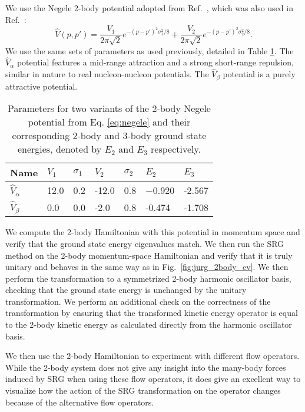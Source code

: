We use the Negele 2-body potential adopted from Ref.~\cite{Alexandrou:1988jg}, which was also used in Ref.~\cite{Jurgenson:2008jp}:
\begin{equation}\label{eq:negele}
\hat{V}(p, p') = \frac{V_1}{2\pi\sqrt2}e^{-(p-p')^2\sigma_1^2/8} + \frac{V_2}{2\pi\sqrt2}e^{-(p-p')^2\sigma_2^2/8}.
\end{equation}
We use the same sets of parameters as used previously, detailed in Table \ref{table:negele_params}. The $\hat{V}_\alpha$ potential features a mid-range attraction and a strong short-range repulsion, similar in nature to real nucleon-nucleon potentials. The $\hat{V}_\beta$ potential is a purely attractive potential.

\begin{table}[t]
\begin{center}
\begin{tabularx}{\textwidth}{ X X X X X X X } 
 \hline
 Name & $V_1$ & $\sigma_1$ & $V_2$ & $\sigma_2$ & $E_2$ & $E_3$ \\ 
 \hline
 $\hat{V}_\alpha$ & 12.0 & 0.2 & -12.0 & 0.8 & −0.920 & -2.567\\ 
 $\hat{V}_\beta$ & 0.0 & 0.0 & -2.0 & 0.8 & -0.474 & -1.708 \\ 
 \hline
\end{tabularx}
\end{center}
\caption{Parameters for two variants of the 2-body Negele potential from Eq. \ref{eq:negele} and their corresponding 2-body and 3-body ground state energies, denoted by $E_2$ and $E_3$ respectively.}
\label{table:negele_params}
\end{table}

We compute the 2-body Hamiltonian with this potential in momentum space and verify that the ground state energy eigenvalues match. We then run the SRG method on the 2-body momentum-space Hamiltonian and verify that it is truly unitary and behaves in the same way as in Fig.~\ref{fig:jurg_2body_ev}. We then perform the transformation to a symmetrized 2-body harmonic oscillator basis, checking that the ground state energy is unchanged by the unitary transformation. We perform an additional check on the correctness of the transformation by ensuring that the transformed kinetic energy operator is equal to the 2-body kinetic energy as calculated directly from the harmonic oscillator basis.

We then use the 2-body Hamiltonian to experiment with different flow operators. While the 2-body system does not give any insight into the many-body forces induced by SRG when using these flow operators, it does give an excellent way to visualize how the action of the SRG transformation on the operator changes because of the alternative flow operators.

